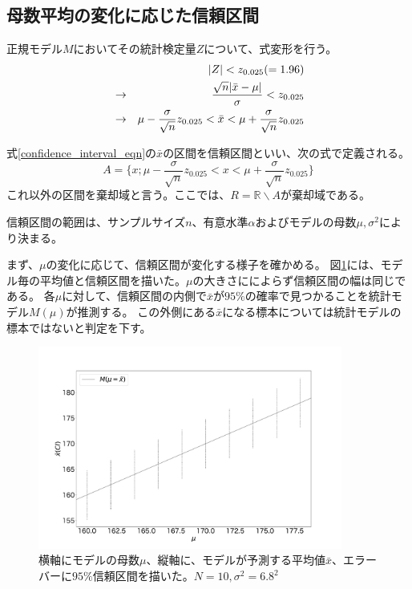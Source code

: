 \subsection{母数平均の変化に応じた信頼区間}
正規モデル$M$においてその統計検定量$Z$について、式変形を行う。
\begin{eqnarray}
    & &|Z| < z_{0.025}( = 1.96 ) \notag \\
    &\rightarrow& \frac{\sqrt{n}|\bar{x}-\mu|}{\sigma} < z_{0.025} \notag\\
    &\rightarrow& \mu-\frac{\sigma}{\sqrt{n}}z_{0.025} < \bar{x} < \mu+\frac{\sigma}{\sqrt{n}}z_{0.025} \label{confidence_interval_eqn}
\end{eqnarray}

\begin{defi}
式\eqref{confidence_interval_eqn}の$\bar{x}$の区間を信頼区間といい、次の式で定義される。
\begin{equation*}
    A=\{x;\mu-\frac{\sigma}{\sqrt{n}}z_{0.025} < x < \mu+\frac{\sigma}{\sqrt{n}}z_{0.025} \}
\end{equation*}
これ以外の区間を棄却域と言う。ここでは、$R=\mathbb{R}\backslash A$が棄却域である。
\end{defi}
信頼区間の範囲は、サンプルサイズ$n$、有意水準$\alpha$およびモデルの母数$\mu,\sigma^2$により決まる。

まず、$\mu$の変化に応じて、信頼区間が変化する様子を確かめる。
図\ref{fig:confidence_interval_model}には、モデル毎の平均値と信頼区間を描いた。$\mu$の大きさにによらず信頼区間の幅は同じである。
各$\mu$に対して、信頼区間の内側で$\bar{x}$が$95\%$の確率で見つかることを統計モデル$M(\mu)$が推測する。
この外側にある$\bar{x}$になる標本については統計モデルの標本ではないと判定を下す。

\begin{figure}
    \begin{center}
        \includegraphics[width=10cm]{./image/04_/confidence_interval_model.pdf}
        \caption{横軸にモデルの母数$\mu$、縦軸に、モデルが予測する平均値$\bar{x}$、エラーバーに$95\%$信頼区間を描いた。$N=10,\sigma^2=6.8^2$}
        \label{fig:confidence_interval_model}

    \end{center}
\end{figure}



